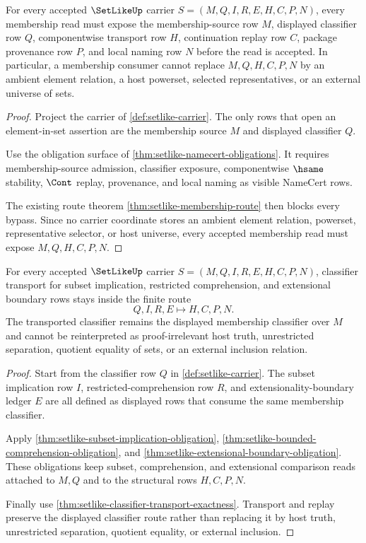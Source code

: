 \begin{theorem}
\label{thm:setlike-membership-source-admission}
For every accepted $\SetLikeUp$ carrier $S=(M,Q,I,R,E,H,C,P,N)$, every membership read must expose the membership-source row $M$, displayed classifier row $Q$, componentwise transport row $H$, continuation replay row $C$, package provenance row $P$, and local naming row $N$ before the read is accepted. In particular, a membership consumer cannot replace $M,Q,H,C,P,N$ by an ambient element relation, a host powerset, selected representatives, or an external universe of sets.
\end{theorem}
\begin{proof}
Project the carrier of \autoref{def:setlike-carrier}. The only rows that open an element-in-set assertion are the membership source $M$ and displayed classifier $Q$.

Use the obligation surface of \autoref{thm:setlike-namecert-obligations}. It requires membership-source admission, classifier exposure, componentwise $\hsame$ stability, $\Cont$ replay, provenance, and local naming as visible NameCert rows.

The existing route theorem \autoref{thm:setlike-membership-route} then blocks every bypass. Since no carrier coordinate stores an ambient element relation, powerset, representative selector, or host universe, every accepted membership read must expose $M,Q,H,C,P,N$.
\end{proof}

\begin{theorem}
\label{thm:setlike-classifier-transport-route}
For every accepted $\SetLikeUp$ carrier $S=(M,Q,I,R,E,H,C,P,N)$, classifier transport for subset implication, restricted comprehension, and extensional boundary rows stays inside the finite route
$$
Q,I,R,E \longmapsto H,C,P,N .
$$
The transported classifier remains the displayed membership classifier over $M$ and cannot be reinterpreted as proof-irrelevant host truth, unrestricted separation, quotient equality of sets, or an external inclusion relation.
\end{theorem}
\begin{proof}
Start from the classifier row $Q$ in \autoref{def:setlike-carrier}. The subset implication row $I$, restricted-comprehension row $R$, and extensionality-boundary ledger $E$ are all defined as displayed rows that consume the same membership classifier.

Apply \autoref{thm:setlike-subset-implication-obligation}, \autoref{thm:setlike-bounded-comprehension-obligation}, and \autoref{thm:setlike-extensional-boundary-obligation}. These obligations keep subset, comprehension, and extensional comparison reads attached to $M,Q$ and to the structural rows $H,C,P,N$.

Finally use \autoref{thm:setlike-classifier-transport-exactness}. Transport and replay preserve the displayed classifier route rather than replacing it by host truth, unrestricted separation, quotient equality, or external inclusion.
\end{proof}

